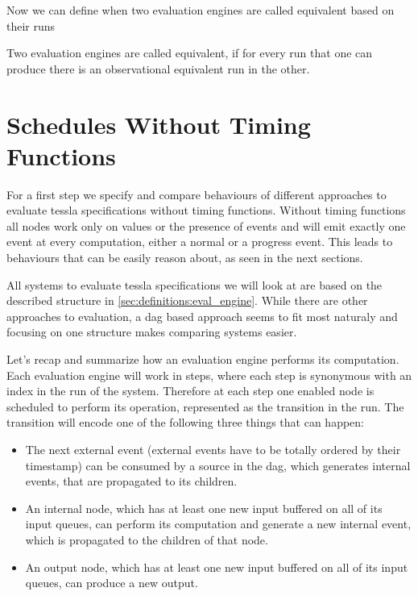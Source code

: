 Now we can define when two evaluation engines are called equivalent based on their runs

\begin{definition}[name=Equivalence of Evaluation Engines]\label{def:equivalence_eval_engine}
  Two evaluation engines are called equivalent, if for every run that one can produce there is an observational equivalent run in the other.
\end{definition}

\section{Schedules Without Timing Functions}
\label{sec:behaviours:without_timing}

For a first step we specify and compare behaviours of different approaches to evaluate \gls{tessla} specifications without timing functions.
Without timing functions all nodes work only on values or the presence of events and will emit exactly one event at every computation, either a normal or a progress event.
This leads to behaviours that can be easily reason about, as seen in the next sections.

All systems to evaluate \gls{tessla} specifications we will look at are based on the described structure in \cref{sec:definitions:eval_engine}.
While there are other approaches to evaluation, a \gls{dag} based approach seems to fit most naturaly and focusing on one structure makes comparing systems easier.

Let's recap and summarize how an evaluation engine performs its computation.
Each evaluation engine will work in steps, where each step is synonymous with an index in the run of the system.
Therefore at each step one enabled node is scheduled to perform its operation, represented as the transition in the run.
The transition will encode one of the following three things that can happen:

\begin{itemize}
  \item The next external event (external events have to be totally ordered by their timestamp) can be consumed by a source in the \gls{dag}, which generates internal events, that are propagated to its children.
  \item An internal node, which has at least one new input buffered on all of its input queues, can perform its computation and generate a new internal event, which is propagated to the children of that node.
  \item An output node, which has at least one new input buffered on all of its input queues, can produce a new output.
\end{itemize}

